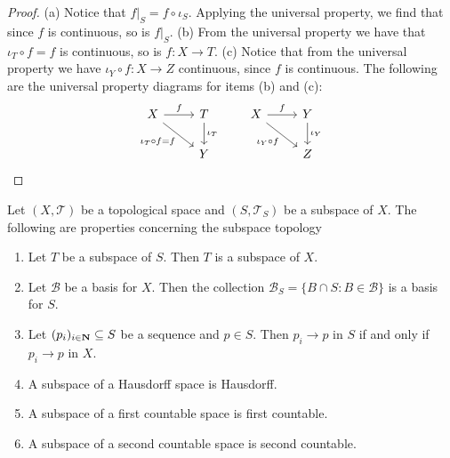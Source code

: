 \begin{proof}
  (a) Notice that \(f|_S = f \circ \iota_S\). Applying the universal property,
  we find that since \(f\) is continuous, so is \(f|_S\). (b) From the universal
  property we have that \(\iota_T \circ f = f\) is continuous, so is \(f: X \to
  T\). (c) Notice that from the universal property we have \(\iota_Y \circ f: X
  \to Z\) continuous, since \(f\) is continuous. The following are the universal
  property diagrams for items (b) and (c):
  \[
    \begin{tikzcd}
      X \rar["f"] \ar[rd, swap, "\iota_T \circ f = f"] &T \dar["\iota_T"] \\ &Y
    \end{tikzcd}
    \qquad
    \begin{tikzcd}
      X \rar["f"] \ar[rd, swap, "\iota_Y \circ f"] &Y \dar["\iota_Y"] \\ &Z
    \end{tikzcd}
  \]
\end{proof}

\begin{proposition}\label{prop: subspace properties}
  Let \((X, \mathcal T)\) be a topological space and \((S, \mathcal T_S)\) be a
  subspace of \(X\). The following are properties concerning the subspace
  topology
  \begin{enumerate}[(SP1)]
    \item\label{prop: subspace transitivity}
      Let \(T\) be a subspace of \(S\). Then \(T\) is a subspace of \(X\).  \item\label{prop: basis for subspace} Let \(\mathcal B\) be a basis for \(X\). Then the collection \(\mathcal B_S = \{B \cap S : B \in \mathcal B\}\) is a basis for \(S\).
    \item\label{prop: convergence subspace}
      Let \((p_i)_{i \in \mathbf{N}} \subseteq S\) be a sequence and \(p \in
      S\). Then \(p_i \to p\) in \(S\) if and only if \(p_i \to p\) in \(X\).
    \item\label{prop: Hausdorff implies Hausdorff subspace}
      A subspace of a Hausdorff space is Hausdorff.
    \item\label{prop: firs count implies first count subspace}
      A subspace of a first countable space is first countable.
    \item\label{prop: sec count implies sec count subspace}
      A subspace of a second countable space is second countable.
  \end{enumerate}
\end{proposition}

